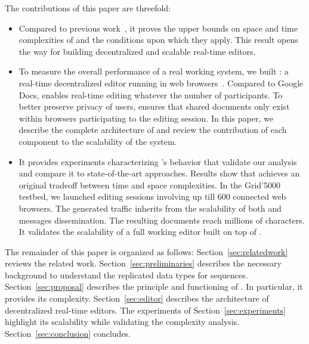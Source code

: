 \noindent The contributions of this paper are threefold:
\begin{itemize}[noitemsep, leftmargin=*]
\item Compared to previous work~\cite{nedelec2013concurrency, nedelec2013lseq},
  it proves the upper bounds on space and time complexities of \LSEQ and the
  conditions upon which they apply. This result opens the way for building
  decentralized and scalable real-time editors.
\item To measure the overall performance of a real working system, we built
  \CRATE: a real-time decentralized editor running in web
  browsers~\cite{nedelec2016crate}. Compared to Google Docs, \CRATE enables
  real-time editing whatever the number of participants. To better preserve
  privacy of users, \CRATE ensures that shared documents only exist within
  browsers participating to the editing session. In this paper, we describe the
  complete architecture of \CRATE and review the contribution of each component
  to the scalability of the system. %
\item It provides experiments characterizing \LSEQ's behavior that validate our
  analysis and compare it to state-of-the-art approaches. Results show that
  \LSEQ achieves an original tradeoff between time and space complexities. In
  the Grid'5000 testbed, we launched \CRATE editing sessions involving up till
  600 connected web browsers. The generated traffic inherits from the
  scalability of both \LSEQ and messages dissemination. The resulting documents
  reach millions of characters. It validates the scalability of a full working
  editor built on top of \LSEQ.
\end{itemize}

The remainder of this paper is organized as follows:
Section~\ref{sec:relatedwork} reviews the related work.
Section~\ref{sec:preliminaries} describes the necessary background to understand
the replicated data types for sequences. Section~\ref{sec:proposal} describes
the principle and functioning of \LSEQ. In particular, it provides its
complexity. Section~\ref{sec:editor} describes the architecture of decentralized
real-time editors. The experiments of Section~\ref{sec:experiments} highlight
its scalability while validating the complexity analysis.
Section~\ref{sec:conclusion} concludes.

